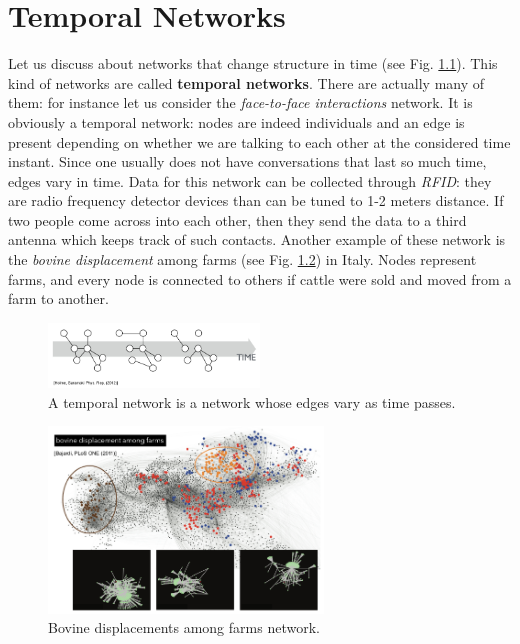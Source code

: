 \documentclass[../main/main.tex]{subfiles}
\begin{document}
\chapter{Temporal Networks}


Let us discuss about networks that change structure in time (see Fig. \ref{fig:17_01}). This kind of networks are called \textbf{temporal networks}. There are actually many of them: for instance let us consider the \textit{face-to-face interactions} network. It is obviously a temporal network: nodes are indeed individuals and an edge is present depending on whether we are talking to each other at the considered time instant. Since one usually does not have conversations that last so much time, edges vary in time. Data for this network can be collected through \textit{RFID}: they are radio frequency detector devices than can be tuned to 1-2 meters distance. If two people come across into each other, then they send the data to a third antenna which keeps track of such contacts.
Another example of these network is the \textit{bovine displacement} among farms (see Fig. \ref{fig:17_02}) in Italy. Nodes represent farms, and every node is connected to others if cattle were sold and moved from a farm to another.

\begin{figure}[h!]
\centering
\includegraphics[width=0.5\textwidth]{../lessons/image/17/image01.png}
\caption{\label{fig:17_01} A temporal network is a network whose edges vary as time passes.}
\end{figure}


\begin{figure}[h!]
\centering
\includegraphics[width=0.65\textwidth]{../lessons/image/17/image02.png}
\caption{\label{fig:17_02} Bovine displacements among farms network. }
\end{figure}
\end{document}
